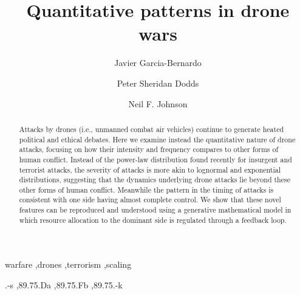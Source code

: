 \documentclass[preprint,12pt]{elsarticle}
\begin{document}
\begin{frontmatter}

\title{Quantitative patterns in drone wars}

\author{
Javier Garcia-Bernardo
}


\address{Department of Computer Science,
  The University of Vermont,
  Burlington, VT 05401.}

\author{
Peter Sheridan Dodds
}


\address{Department of Mathematics \& Statistics,
  Vermont Complex Systems Center,
  Computational Story Lab,
  \& the Vermont Advanced Computing Core,
  The University of Vermont,
  Burlington, VT 05401.}

\author{
Neil F. Johnson
}


\address{Department of Physics,
University of Miami,
Coral Gables, FL 33124.
}

\begin{abstract}
  Attacks by drones (i.e., unmanned combat air vehicles) continue to generate heated political and ethical debates. Here we examine instead the quantitative nature of drone attacks, focusing on how their intensity and frequency compares to other forms of human conflict. Instead of the power-law distribution found recently for insurgent and terrorist attacks, the severity of attacks is more akin to lognormal and exponential distributions, suggesting that the dynamics underlying drone attacks lie beyond these other forms of human conflict. Meanwhile the pattern in the timing of attacks is consistent with one side having almost complete control. We show that these novel features can be reproduced and understood using a generative mathematical model in which resource allocation to the dominant side is regulated through a feedback loop.

\end{abstract}

\begin{keyword}

  
warfare \sep drones \sep terrorism \sep scaling

.-s \sep 89.75.Da \sep 89.75.Fb \sep 89.75.-k

\end{keyword}

\end{frontmatter}
\end{document}
